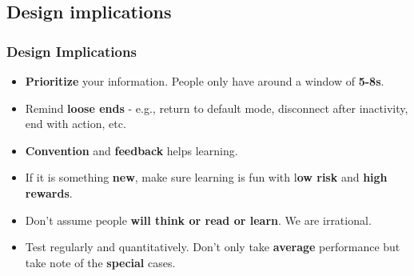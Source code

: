 \documentclass{beamer}
\begin{document}
\subsection{Design implications}

\begin{frame}
	\frametitle{Design Implications}
	\begin{itemize}
			\item \textbf{Prioritize} your information.   People only have around a window of \textbf{5-8s}.
			\item Remind\textbf{ loose ends} - e.g., return to default mode, disconnect after inactivity, end with action, etc.
			\item \textbf{Convention} and \textbf{feedback} helps learning.
			\item If it is something \textbf{new}, make sure learning is fun with l\textbf{ow risk }and \textbf{high rewards}.
			\item Don't assume people \textbf{will think or read or learn}.  We are irrational.
			\item Test regularly and quantitatively.   Don't only take \textbf{average} performance but take note of the \textbf{special} cases.
	\end{itemize}
\end{frame}

%
%		
%		
%
%		
\end{document}
